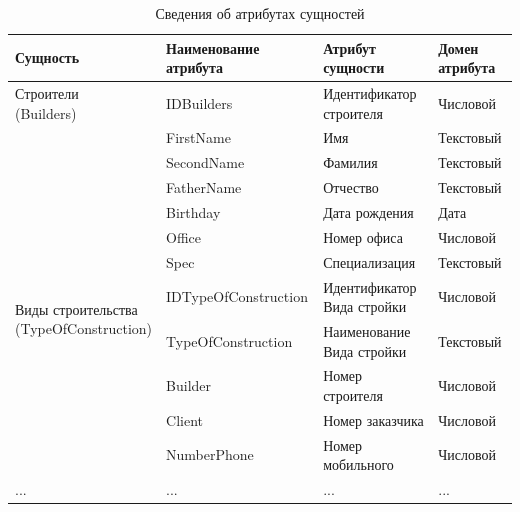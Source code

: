 \documentclass{../SIBGU-state}
\begin{document}
\begin{table}[htb]
	\caption{Сведения об атрибутах сущностей}
	\centering
	\small\begin{tabular}{ |p{3.6cm}|p{4.1cm}|p{3.8cm}|p{3cm}| }
        \hline
		Сущность & Наименование атрибута & Атрибут сущности & Домен атрибута \\ \hline
        \multirow{1}{*}{\parbox[t]{5cm}{Строители \\ (Builders)}} & IDBuilders & Идентификатор строителя & Числовой\\
        \cline{2-4}
        & FirstName & Имя & Текстовый\\
        \cline{2-4}
        & SecondName & Фамилия & Текстовый\\
        \cline{2-4}
        & FatherName & Отчество & Текстовый\\
        \cline{2-4}
        & Birthday & Дата рождения & Дата\\
        \cline{2-4}
        & Office & Номер офиса & Числовой\\
        \cline{2-4}
        & Spec & Специализация & Текстовый\\
        \hline
        \multirow{2}{*}{\parbox[t]{5cm}{Виды строительства \\ (TypeOfConstruction)}} & IDTypeOfConstruction & Идентификатор Вида стройки & Числовой\\
        \cline{2-4}
        & TypeOfConstruction & Наименование Вида стройки & Текстовый\\
        \cline{2-4}
        & Builder & Номер строителя & Числовой\\
        \cline{2-4}
        & Client & Номер заказчика & Числовой\\
        \cline{2-4}
        & NumberPhone & Номер мобильного & Числовой\\
        \hline
        ... & ... & ... & ... \\
        \hline
	\end{tabular}
	\label{tab:in_appendix}
\end{table}\par
\end{document}
